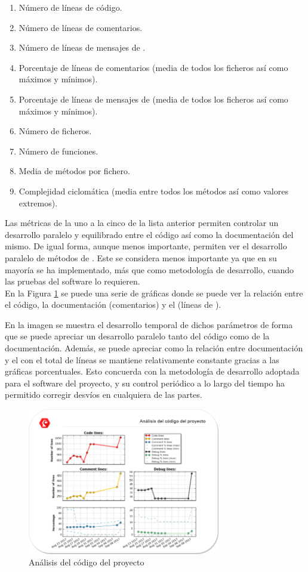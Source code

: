     \begin{enumerate}
        \item Número de líneas de código.
        \item Número de líneas de comentarios.
        \item Número de líneas de mensajes de .
        \item Porcentaje de líneas de comentarios (media de todos los ficheros así como máximos y mínimos).
        \item Porcentaje de líneas de mensajes de  (media de todos los ficheros así como máximos y mínimos).
        \item Número de ficheros.
        \item Número de funciones.
        \item Media de métodos por fichero.
        \item Complejidad ciclomática  (media entre todos los métodos así como valores extremos).
    \end{enumerate}
    
    Las métricas de la uno a la cinco de la lista anterior permiten controlar un desarrollo paralelo y equilibrado entre el código así como la documentación del mismo. De igual forma, aunque menos importante, permiten ver el desarrollo paralelo de métodos de . Este se considera menos importante ya que en su mayoría se ha implementado, más que como metodología de desarrollo, cuando las pruebas del software lo requieren.
    \\ 
    
    En la Figura \ref{fig:SW:code_analysis} se puede una serie de gráficas donde se puede ver la relación entre el código, la documentación (comentarios) y el  (líneas de ). 
    
    En la imagen se muestra el desarrollo temporal de dichos parámetros de forma que se puede apreciar un desarrollo paralelo tanto del código como de la documentación. Además, se puede apreciar como la relación entre documentación y el  con el total de líneas se mantiene relativamente constante gracias a las gráficas porcentuales. Esto concuerda con la metodología de desarrollo adoptada para el software del proyecto, y su control periódico a lo largo del tiempo ha permitido corregir desvíos en cualquiera de las partes.
    
    \begin{figure}[H]
        \centering
        \includegraphics[width=0.75\textwidth]{figuras/SW/analisis_codigo.png}   
        \caption{Análisis del código del proyecto}
        \label{fig:SW:code_analysis}
    \end{figure}
    
